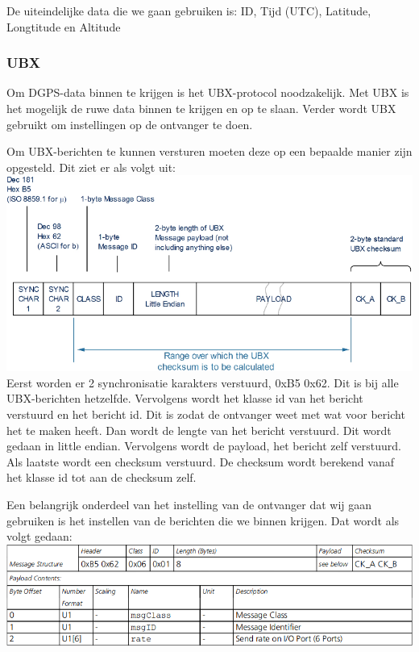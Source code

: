 De uiteindelijke data die we gaan gebruiken is:
ID, Tijd (UTC), Latitude, Longtitude en Altitude

\newpage
\subsubsection{UBX}
Om DGPS-data binnen te krijgen is het UBX-protocol noodzakelijk. Met UBX is het
mogelijk de ruwe data binnen te krijgen en op te slaan.
Verder wordt UBX gebruikt om instellingen op de ontvanger te doen.

Om UBX-berichten te kunnen versturen moeten deze op een bepaalde manier zijn
opgesteld. Dit ziet er als volgt uit:\\
\includegraphics[width=\textwidth]{technical/ubx}
\citep[p. 132]{UBlox8}\\

Eerst worden er 2 synchronisatie karakters verstuurd, 0xB5 0x62. Dit is bij
alle UBX-berichten hetzelfde. Vervolgens wordt het klasse id van het bericht
verstuurd en het bericht id. Dit is zodat de ontvanger weet met wat voor bericht
het te maken heeft. Dan wordt de lengte van het bericht verstuurd. Dit wordt
gedaan in little endian. Vervolgens wordt de payload, het bericht zelf
verstuurd. Als laatste wordt een checksum verstuurd. De checksum wordt berekend
vanaf het klasse id tot aan de checksum zelf.

Een belangrijk onderdeel van het instelling van de ontvanger dat wij gaan
gebruiken is het instellen van de berichten die we binnen krijgen.
Dat wordt als volgt gedaan:
\includegraphics[width=\textwidth]{technical/set-rate}
\citep[p. 171]{UBlox8}\\

